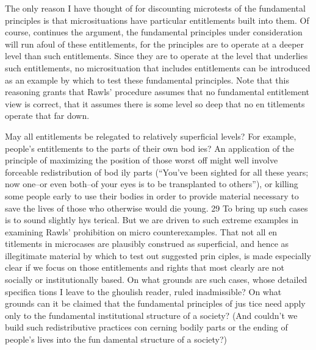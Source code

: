 \documentclass[11pt,openany]{book}
\begin{document}
The only reason I have thought of for discounting microtests of the fundamental principles is that microsituations have particular entitlements built into them. Of course, continues the argument, the fundamental principles under consideration will run afoul of these entitlements, for the principles are to operate at a deeper level than such entitlements. Since they are to operate at the level that underlies such entitlements, no microsituation that includes entitlements can be introduced as an example by which to test these fundamental principles. Note that this reasoning grants that Rawls' procedure assumes that no fundamental entitlement view is correct, that it assumes there is some level so deep that no en titlements operate that far down. 

May all entitlements be relegated to relatively superficial levels? For example, people's entitlements to the parts of their own bod ies? An application of the principle of maximizing the position of those worst off might well involve forceable redistribution of bod ily parts (``You've been sighted for all these years; now one--or even both--of your eyes is to be transplanted to others''), or killing some people early to use their bodies in order to provide material necessary to save the lives of those who otherwise would die young. 29 To bring up such cases is to sound slightly hys terical. But we are driven to such extreme examples in examining Rawls' prohibition on micro counterexamples. That not all en titlements in microcases are plausibly construed as superficial, and hence as illegitimate material by which to test out suggested prin ciples, is made especially clear if we focus on those entitlements and rights that most clearly are not socially or institutionally based. On what grounds are such cases, whose detailed specifica tions I leave to the ghoulish reader, ruled inadmissible? On what grounds can it be claimed that the fundamental principles of jus tice need apply only to the fundamental institutional structure of a society? (And couldn't we build such redistributive practices con cerning bodily parts or the ending of people's lives into the fun damental structure of a society?) 
\end{document}
